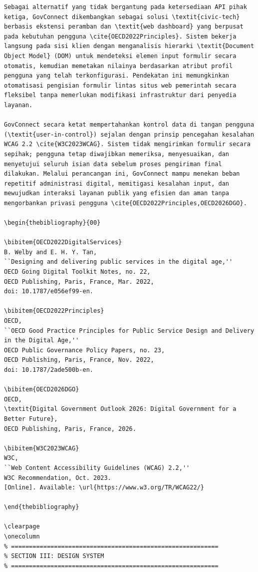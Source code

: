 \documentclass[conference]{IEEEtran}
\begin{document}
\begin{lstlisting}
Sebagai alternatif yang tidak bergantung pada ketersediaan API pihak ketiga, GovConnect dikembangkan sebagai solusi \textit{civic-tech} berbasis ekstensi peramban dan \textit{web dashboard} yang berpusat pada kebutuhan pengguna \cite{OECD2022Principles}. Sistem bekerja langsung pada sisi klien dengan menganalisis hierarki \textit{Document Object Model} (DOM) untuk mendeteksi elemen input formulir secara otomatis, kemudian memetakan nilainya berdasarkan atribut profil pengguna yang telah terkonfigurasi. Pendekatan ini memungkinkan otomatisasi pengisian formulir lintas situs web pemerintah secara fleksibel tanpa memerlukan modifikasi infrastruktur dari penyedia layanan.

GovConnect secara ketat mempertahankan kontrol data di tangan pengguna (\textit{user-in-control}) sejalan dengan prinsip pencegahan kesalahan WCAG 2.2 \cite{W3C2023WCAG}. Sistem tidak mengirimkan formulir secara sepihak; pengguna tetap diwajibkan memeriksa, menyesuaikan, dan menyetujui seluruh isian data sebelum proses pengiriman final dilakukan. Melalui perancangan ini, GovConnect mampu menekan beban repetitif administrasi digital, memitigasi kesalahan input, dan mewujudkan interaksi layanan publik yang efisien dan aman tanpa mengorbankan privasi pengguna \cite{OECD2022Principles,OECD2026DGO}.

\begin{thebibliography}{00}

\bibitem{OECD2022DigitalServices}
B. Welby and E. H. Y. Tan,
``Designing and delivering public services in the digital age,''
OECD Going Digital Toolkit Notes, no. 22,
OECD Publishing, Paris, France, Mar. 2022,
doi: 10.1787/e056ef99-en.

\bibitem{OECD2022Principles}
OECD,
``OECD Good Practice Principles for Public Service Design and Delivery in the Digital Age,''
OECD Public Governance Policy Papers, no. 23,
OECD Publishing, Paris, France, Nov. 2022,
doi: 10.1787/2ade500b-en.

\bibitem{OECD2026DGO}
OECD,
\textit{Digital Government Outlook 2026: Digital Government for a Better Future},
OECD Publishing, Paris, France, 2026.

\bibitem{W3C2023WCAG}
W3C,
``Web Content Accessibility Guidelines (WCAG) 2.2,''
W3C Recommendation, Oct. 2023.
[Online]. Available: \url{https://www.w3.org/TR/WCAG22/}

\end{thebibliography}

\clearpage
\onecolumn
% ==========================================================
% SECTION III: DESIGN SYSTEM
% ==========================================================

\end{lstlisting}
\end{document}

